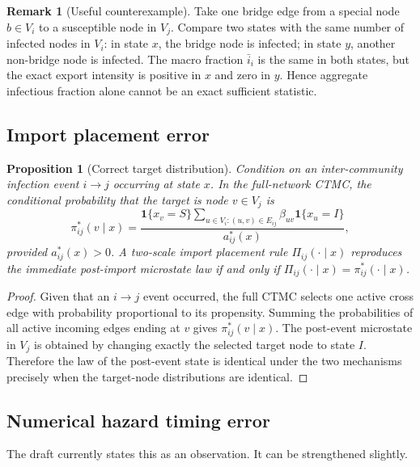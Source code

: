 \documentclass[12pt,a4paper]{article}
\newtheorem{proposition}{Proposition}
\theoremstyle{definition}
\newtheorem{remark}{Remark}
\newcommand{\1}{\mathbf{1}}
\begin{document}
\begin{remark}[Useful counterexample]
Take one bridge edge from a special node $b\in V_i$ to a susceptible node in $V_j$.  Compare two states with the same number of infected nodes in $V_i$: in state $x$, the bridge node is infected; in state $y$, another non-bridge node is infected.  The macro fraction $\bar i_i$ is the same in both states, but the exact export intensity is positive in $x$ and zero in $y$.  Hence aggregate infectious fraction alone cannot be an exact sufficient statistic.
\end{remark}

\subsection{Import placement error}

\begin{proposition}[Correct target distribution]
Condition on an inter-community infection event $i\to j$ occurring at state $x$.  In the full-network CTMC, the conditional probability that the target is node $v\in V_j$ is
\begin{equation}
    \pi_{ij}^*(v\mid x)=
    \frac{\1\{x_v=S\}\sum_{u\in V_i:(u,v)\in E_{ij}}\beta_{uv}\1\{x_u=I\}}
    {a_{ij}^*(x)},
\end{equation}
provided $a_{ij}^*(x)>0$.  A two-scale import placement rule $\Pi_{ij}(\cdot\mid x)$ reproduces the immediate post-import microstate law if and only if $\Pi_{ij}(\cdot\mid x)=\pi_{ij}^*(\cdot\mid x)$.
\end{proposition}

\begin{proof}
Given that an $i\to j$ event occurred, the full CTMC selects one active cross edge with probability proportional to its propensity.  Summing the probabilities of all active incoming edges ending at $v$ gives $\pi_{ij}^*(v\mid x)$.  The post-event microstate in $V_j$ is obtained by changing exactly the selected target node to state $I$.  Therefore the law of the post-event state is identical under the two mechanisms precisely when the target-node distributions are identical.
\end{proof}

\subsection{Numerical hazard timing error}

The draft currently states this as an observation.  It can be strengthened slightly.
\end{document}
